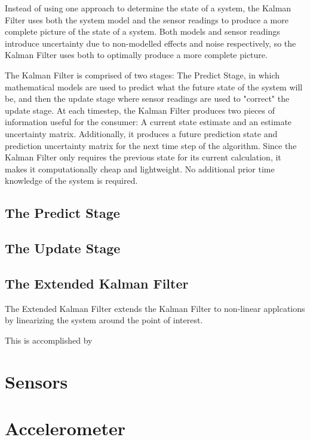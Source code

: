 \documentclass{article}
\begin{document}
Instead of using one approach to determine the state of a system, the Kalman Filter uses both the system model and the sensor readings to produce a more complete picture of the state of a system. Both models and sensor readings introduce uncertainty due to non-modelled effects and noise respectively, so the Kalman Filter uses both to optimally produce a more complete picture.

The Kalman Filter is comprised of two stages: The Predict Stage, in which mathematical models are used to predict what the future state of the system will be, and then the update stage where sensor readings are used to "correct" the update stage. At each timestep, the Kalman Filter produces two pieces of information useful for the consumer: A current state estimate and an estimate uncertainty matrix. Additionally, it produces a future prediction state and prediction uncertainty matrix for the next time step of the algorithm. Since the Kalman Filter only requires the previous state for its current calculation, it makes it computationally cheap and lightweight. No additional prior time knowledge of the system is required.

\subsection{The Predict Stage}



\subsection{The Update Stage}

\subsection{The Extended Kalman Filter}

The Extended Kalman Filter extends the Kalman Filter to non-linear applcations by linearizing the system around the point of interest. 

This is accomplished by

\section{Sensors}

\section{Accelerometer}
\end{document}
